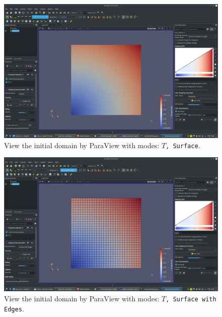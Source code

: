 \documentclass[onsided]{book}
\numberwithin{equation}{section}
\begin{document}
\begin{enumerate}
\begin{enumerate}
        \begin{figure}[H]
            \centering
            \includegraphics[height=0.44\textheight]{level_set_initial_domain_T_Surface}
            \caption{View the initial domain by ParaView with modes: \texttt{$T$, Surface}.}
        \end{figure}
        
        \begin{figure}[H]
            \centering
            \includegraphics[height=0.44\textheight]{level_set_initial_domain_T_Surface_with_Edges}
            \caption{View the initial domain by ParaView with modes: \texttt{$T$, Surface with Edges}.}
        \end{figure}
        

\end{enumerate}
\end{enumerate}
\end{document}

